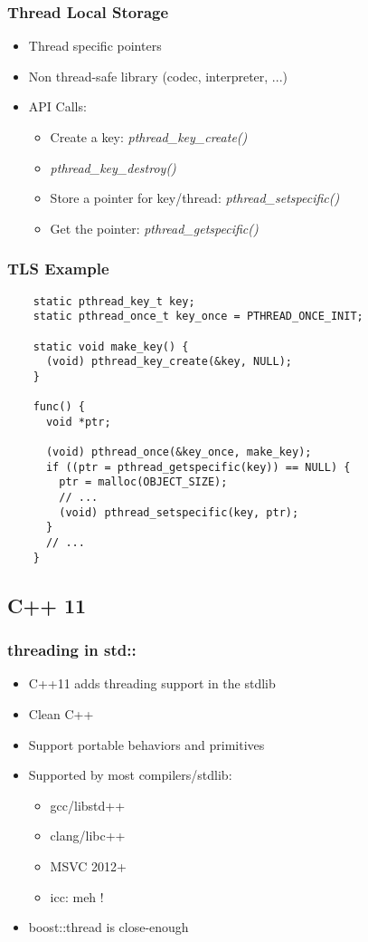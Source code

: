 \begin{frame}
  \frametitle{Thread Local Storage}

  \begin{itemize}
  \item Thread specific pointers
  \item Non thread-safe library (codec, interpreter, ...)
  \item API Calls:
    \begin{itemize}
    \item Create a key: \emph{pthread\_key\_create()}
    \item \emph{pthread\_key\_destroy()}
    \item Store a pointer for key/thread: \emph{pthread\_setspecific()}
    \item Get the pointer: \emph{pthread\_getspecific()}
    \end{itemize}
  \end{itemize}
\end{frame}

\begin{frame}[fragile]
  \frametitle{TLS Example}

  \begin{verbatim}
    static pthread_key_t key;
    static pthread_once_t key_once = PTHREAD_ONCE_INIT;

    static void make_key() {
      (void) pthread_key_create(&key, NULL);
    }

    func() {
      void *ptr;

      (void) pthread_once(&key_once, make_key);
      if ((ptr = pthread_getspecific(key)) == NULL) {
        ptr = malloc(OBJECT_SIZE);
        // ...
        (void) pthread_setspecific(key, ptr);
      }
      // ...
    }
  \end{verbatim}
\end{frame}




\subsection{C++ 11}
\label{subsec:cpp11}

\begin{frame}
  \frametitle{threading in std::}

  \begin{itemize}
  \item C++11 adds threading support in the stdlib
  \item Clean C++
  \item Support portable behaviors and primitives
  \item Supported by most compilers/stdlib:
    \begin{itemize}
    \item gcc/libstd++
    \item clang/libc++
    \item MSVC 2012+
    \item icc: meh !
    \end{itemize}
  \item boost::thread is close-enough
  \end{itemize}
\end{frame}



